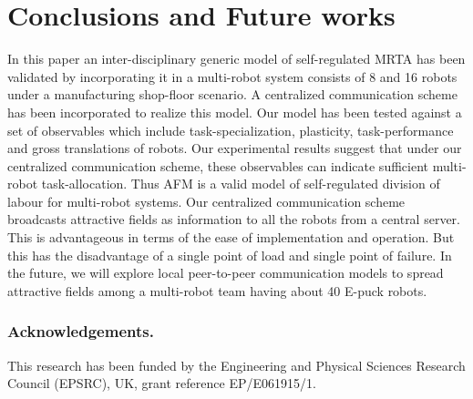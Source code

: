 \documentclass[smallcondensed]{svjour3}
\begin{document}
\section{Conclusions and Future works}
\label{sec:conc}
In this paper  an inter-disciplinary generic model of self-regulated MRTA has been validated by incorporating it in a multi-robot system consists of 8 and 16 robots under a manufacturing shop-floor scenario. A centralized communication scheme has been incorporated to realize this model. Our model has been tested against a set of observables which include task-specialization, plasticity, task-performance and gross translations of robots.  Our experimental results suggest that under our centralized  communication scheme, these observables can indicate sufficient multi-robot task-allocation.  Thus AFM is a valid model of  self-regulated division of labour for multi-robot systems.
Our centralized communication scheme broadcasts attractive fields as information to all the robots from a central server. This is advantageous in terms of the ease of implementation and operation. But this has the disadvantage of a single point of load and single point of failure. In the future, we will explore local peer-to-peer communication models to spread attractive fields among a multi-robot team having about 40 E-puck robots.
\subsubsection*{Acknowledgements. } 
This research has been funded by the Engineering and Physical Sciences Research Council (EPSRC), UK, grant reference EP/E061915/1.
 
%
%
%            
%
\end{document}
